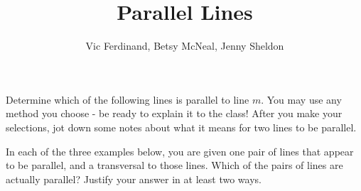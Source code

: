\documentclass{ximera}
\title{Parallel Lines}
\author{Vic Ferdinand, Betsy McNeal, Jenny Sheldon}
\begin{document}
\begin{abstract}\end{abstract}
\maketitle


\begin{problem} \label{ParallelLines1}
Determine which of the following lines is parallel to line $m$.  You may use any method you choose - be ready to explain it to the class!  After you make your selections, jot down some notes about what it means for two lines to be parallel.

\begin{center}
\end{center}


\end{problem}


\newpage
\begin{problem} \label{ParallelLines2}

In each of the three examples below, you are given one pair of lines that appear to be parallel, and a transversal to those lines.  Which of the pairs of lines are actually parallel?  Justify your answer in at least two ways.


\begin{center}
\end{center}

\begin{center}
\end{center}

\begin{center}
\end{center}





\end{problem}
\end{document}
